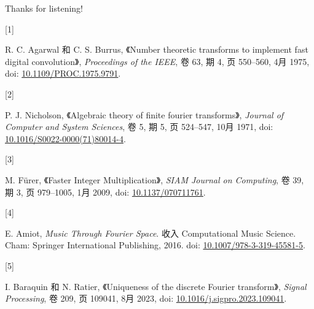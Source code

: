 \documentclass[
  ignorenonframetext,
  chinese-hans,
]{beamer}
\newlength{\cslhangindent}
\newlength{\csllabelwidth}
\newenvironment{CSLReferences}[2] %
 {\begin{list}{}{%
  \setlength{\itemindent}{0pt}
  \setlength{\leftmargin}{0pt}
  \setlength{\parsep}{0pt}
  \ifodd #1
   \setlength{\leftmargin}{\cslhangindent}
   \setlength{\itemindent}{-1\cslhangindent}
  \fi
  \setlength{\itemsep}{#2\baselineskip}}}
 {\end{list}}
\newcommand{\CSLLeftMargin}[1]{\parbox[t]{\csllabelwidth}{\strut#1\strut}}
\newcommand{\CSLRightInline}[1]{\parbox[t]{\linewidth - \csllabelwidth}{\strut#1\strut}}
\theoremstyle{plain}
\theoremstyle{plain}
\theoremstyle{plain}
\theoremstyle{plain}
\theoremstyle{remark}
\begin{document}
\begin{frame}{}
\label{section-2}
Thanks for listening!

\label{refs}
\begin{CSLReferences}{0}{0}
\CSLLeftMargin{{[}1{]} }%
\CSLRightInline{R. C. Agarwal 和 C. S. Burrus, {《Number theoretic
transforms to implement fast digital convolution》}, \emph{Proceedings
of the IEEE}, 卷 63, 期 4, 页 550--560, 4月 1975, doi:
\href{https://doi.org/10.1109/PROC.1975.9791}{10.1109/PROC.1975.9791}.}

\CSLLeftMargin{{[}2{]} }%
\CSLRightInline{P. J. Nicholson, {《Algebraic theory of finite fourier
transforms》}, \emph{Journal of Computer and System Sciences}, 卷 5, 期
5, 页 524--547, 10月 1971, doi:
\href{https://doi.org/10.1016/S0022-0000(71)80014-4}{10.1016/S0022-0000(71)80014-4}.}

\CSLLeftMargin{{[}3{]} }%
\CSLRightInline{M. Fürer, {《Faster {Integer} {Multiplication}》},
\emph{SIAM Journal on Computing}, 卷 39, 期 3, 页 979--1005, 1月 2009,
doi: \href{https://doi.org/10.1137/070711761}{10.1137/070711761}.}

\CSLLeftMargin{{[}4{]} }%
\CSLRightInline{E. Amiot, \emph{Music {Through} {Fourier} {Space}}. 收入
Computational {Music} {Science}. Cham: Springer International
Publishing, 2016. doi:
\href{https://doi.org/10.1007/978-3-319-45581-5}{10.1007/978-3-319-45581-5}.}

\CSLLeftMargin{{[}5{]} }%
\CSLRightInline{I. Baraquin 和 N. Ratier, {《Uniqueness of the discrete
{Fourier} transform》}, \emph{Signal Processing}, 卷 209, 页 109041, 8月
2023, doi:
\href{https://doi.org/10.1016/j.sigpro.2023.109041}{10.1016/j.sigpro.2023.109041}.}

\end{CSLReferences}
\end{frame}
\end{document}
